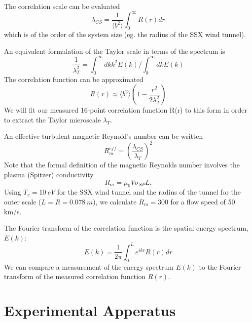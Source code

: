 \documentclass[aip,prl,amsmath,amssymb,reprint,superscriptaddress]{revtex4-1} %
\begin{document}
The correlation scale can be evaluated
%
\begin{equation}
\lambda_{CS}  = \frac{1}{\langle b^2 \rangle} \int_0^\infty R(r) dr
\label{eq:tayscale2}
\end{equation}
%
which is of the order of the system size (eg. the radius of the SSX wind tunnel).

An equivalent formulation of the Taylor scale in terms of the spectrum is
%
\begin{equation}
\frac{1}{\lambda_T^2}  = \int_0^\infty dk k^2 E(k)/\int_0^\infty dk E(k)
\label{eq:tayscale3}
\end{equation}
%
The correlation function can be approximated
\begin{equation}
R(r) \approx  \langle b^2 \rangle \left(1 - \frac{r^2}{2 \lambda_T^2}  \right)
\label{eq:correlation2}  
\end{equation}
%
We will fit our measured 16-point correlation function R(r) to this form in order to extract the Taylor microscale $\lambda_T$. 

An effective turbulent magnetic Reynold's number can be written \cite{Batchelor70}
%
\begin{equation}
R_m^{eff}  = \left(\frac{\lambda_{CS}}{\lambda_T} \right)^2
\label{eq:magReynNum}
\end{equation}
%
Note that the formal definition of the magnetic Reynolds number involves the plasma (Spitzer) conductivity
\begin{equation}
R_m = \mu_0 V \sigma_{SP} L.
\label{eq:magReynNum2} 
\end{equation}
%
Using $T_e = 10~eV$ for the SSX wind tunnel and the radius of the tunnel for the outer scale ($L = R = 0.078~m$), we calculate $R_m = 300$ for a flow speed of 50 km/s.

The Fourier transform of the correlation function is the spatial energy spectrum, $E(k)$:
%
\begin{equation}
E(k) = \frac{1}{2 \pi} \int_0^L e^{ikr} R(r) dr
\label{eq:spectrum1}
\end{equation}
%
We can compare a measurement of the energy spectrum $E(k)$ to the Fourier transform of the measured correlation function $R(r)$.

\section{Experimental Apperatus}
\end{document}
